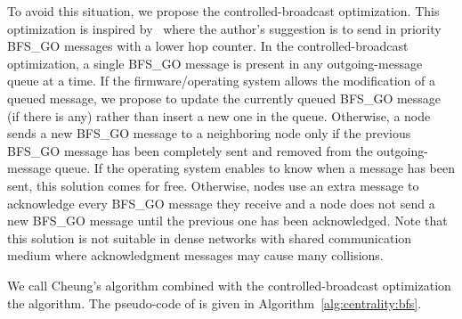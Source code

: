 To avoid this situation, we propose the controlled-broadcast optimization. This optimization is inspired by~\cite{gallager1982distributed} where the author's suggestion is to send in priority BFS\_GO messages with a lower hop counter. In the controlled-broadcast optimization, a single BFS\_GO message is present in any outgoing-message queue at a time. If the firmware/operating system allows the modification of a queued message, we propose to update the currently queued BFS\_GO message (if there is any) rather than insert a new one in the queue. Otherwise, a node sends a new BFS\_GO message to a neighboring node only if the previous BFS\_GO message has been completely sent and removed from the outgoing-message queue. If the operating system enables to know when a message has been sent, this solution comes for free. Otherwise, nodes use an extra message to acknowledge every BFS\_GO message they receive and a node does not send a new BFS\_GO message until the previous one has been acknowledged. Note that this solution is not suitable in dense networks with shared communication medium where acknowledgment messages may cause many collisions.

We call Cheung's algorithm combined with the controlled-broadcast optimization the \cheungCb{} algorithm. The pseudo-code of \cheungCb{} is given in Algorithm~\ref{alg:centrality:bfs}.



\newcommand{\LEOnly}[1]{\textcolor{gray}{$\llcorner$#1$\urcorner$}~}

\newcommand{\AggOnly}[1]{\textcolor{myBrown}{$_\dag$#1$^\dag$}}

